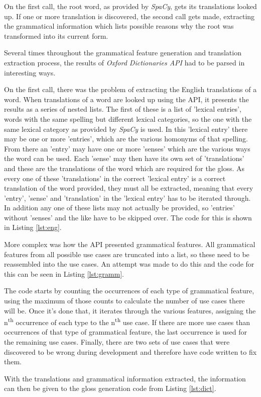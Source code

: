 On the first call, the root word, as provided by \textit{SpaCy}, gets its translations looked up. If one or more translation is discovered, the second call gets made, extracting the grammatical information which lists possible reasons why the root was transformed into its current form.

Several times throughout the grammatical feature generation and translation extraction process, the results of \textit{Oxford Dictionaries API} had to be parsed in interesting ways. 

On the first call, there was the problem of extracting the English translations of a word. When translations of a word are looked up using the API, it presents the results as a series of nested lists.  The first of these is a list of 'lexical entries', words with the same spelling but different lexical categories, so the one with the same lexical category as provided by \textit{SpaCy} is used. In this 'lexical entry' there may be one or more 'entries', which are the various homonyms of that spelling. From there an 'entry' may have one or more 'senses' which are the various ways the word can be used. Each 'sense' may then have its own set of 'translations' and these are the translations of the word which are required for the gloss. As every one of these 'translations' in the correct 'lexical entry' is a correct translation of the word provided, they must all be extracted, meaning that every 'entry', 'sense' and 'translation' in the 'lexical entry' has to be iterated through. In addition any one of these lists may not actually be provided, so 'entries' without 'senses' and the like have to be skipped over. The code for this is shown in Listing \ref{lst:eng}. 



More complex was how the API presented grammatical features. All grammatical features from all possible use cases are truncated into a list, so these need to be reassembled into the use cases. An attempt was made to do this and the code for this can be seen in Listing \ref{lst:gramm}.



The code starts by counting the occurrences of each type of grammatical feature, using the maximum of those counts to calculate the number of use cases there will be. Once it's done that, it iterates through the various features, assigning the n\textsuperscript{th} occurrence of each type to the n\textsuperscript{th} use case. If there are more use cases than occurrences of that type of grammatical feature, the last occurrence is used for the remaining use cases. Finally, there are two sets of use cases that were discovered to be wrong during development and therefore have code written to fix them. 

With the translations and grammatical information extracted, the information can then be given to the gloss generation code from Listing \ref{lst:dict}. 
